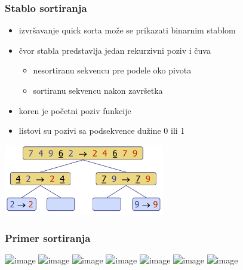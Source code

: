 \documentclass[compress]{beamer}
\begin{document}
\begin{frame}[fragile]
  \frametitle{Stablo sortiranja}
  \begin{itemize}
    \item izvršavanje quick sorta može se prikazati binarnim stablom
    \item čvor stabla predstavlja jedan rekurzivni poziv i čuva
    \begin{itemize}
      \item nesortiranu sekvencu pre podele oko pivota
      \item sortiranu sekvencu nakon završetka
    \end{itemize}
    \item koren je početni poziv funkcije
    \item listovi su pozivi sa podsekvence dužine 0 ili 1
  \end{itemize}
  \begin{center}
    \includegraphics[width=7cm]{asp-12-pic15.png}
  \end{center}
\end{frame}

\begin{frame}[fragile]
  \frametitle{Primer sortiranja}
  \begin{itemize}
  \end{itemize}
  \begin{center}
    \includegraphics<1>[width=11cm]{asp-12-pic16.png}
    \includegraphics<2>[width=11cm]{asp-12-pic17.png}
    \includegraphics<3>[width=11cm]{asp-12-pic18.png}
    \includegraphics<4>[width=11cm]{asp-12-pic19.png}
    \includegraphics<5>[width=11cm]{asp-12-pic20.png}
    \includegraphics<6>[width=11cm]{asp-12-pic21.png}
    \includegraphics<7>[width=11cm]{asp-12-pic22.png}
  \end{center}
\end{frame}
\end{document}
